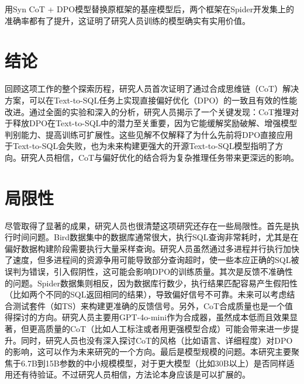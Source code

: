 用Syn CoT + DPO模型替换原框架的基座模型后，两个框架在Spider开发集上的准确率都有了提升，这证明了研究人员训练的模型确实有实用价值。

\section{结论}
回顾这项工作的整个探索历程，研究人员首次证明了通过合成思维链（CoT）解决方案，可以在Text-to-SQL任务上实现直接偏好优化（DPO）的一致且有效的性能改进。通过全面的实验和深入的分析，研究人员揭示了一个关键发现：CoT推理对于释放DPO在Text-to-SQL中的潜力至关重要，因为它能缓解奖励破解、增强模型判别能力、提高训练可扩展性。这些见解不仅解释了为什么先前将DPO直接应用于Text-to-SQL会失败，也为未来构建更强大的开源Text-to-SQL模型指明了方向。研究人员相信，CoT与偏好优化的结合将为复杂推理任务带来更深远的影响。

\section{局限性}
尽管取得了显著的成果，研究人员也很清楚这项研究还存在一些局限性。首先是执行时间问题。Bird数据集中的数据库通常很大，执行SQL查询非常耗时，尤其是在偏好数据构建阶段需要执行大量采样查询。研究人员虽然通过多进程并行执行加快了速度，但多进程间的资源争用可能导致部分查询超时，使一些本应正确的SQL被误判为错误，引入假阴性，这可能会影响DPO的训练质量。其次是反馈不准确性的问题。Spider数据集则相反，因为数据库行数少，执行结果匹配容易产生假阳性（比如两个不同的SQL返回相同的结果），导致偏好信号不可靠。未来可以考虑结合测试套件（如TS）来构建更准确的反馈信号。另外，CoT合成质量也是一个值得探讨的方向。研究人员主要用GPT-4o-mini作为合成器，虽然成本低而且效果显著，但更高质量的CoT（比如人工标注或者用更强模型合成）可能会带来进一步提升。同时，研究人员也没有深入探讨CoT的风格（比如语言、详细程度）对DPO的影响，这可以作为未来研究的一个方向。最后是模型规模的问题。本研究主要聚焦于6.7B到15B参数的中小规模模型，对于更大模型（比如30B以上）是否同样适用还有待验证。不过研究人员相信，方法论本身应该是可以扩展的。

